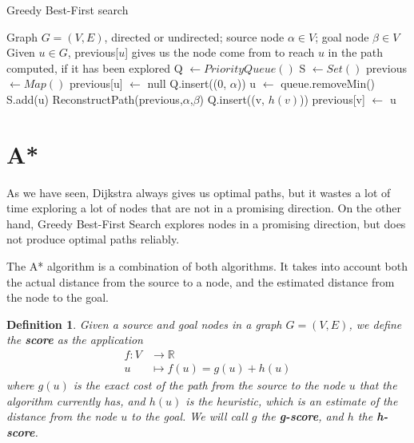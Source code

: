 \documentclass[12pt]{report}
\newtheorem{definition}[theorem]{Definition}
\begin{document}
\begin{algorithm}
\caption{Greedy Best-First search}
\label{alg:greedy}
\begin{algorithmic}[1]
\Require Graph $G = (V, E)$, directed or undirected; source node $\alpha \in V$; goal node $\beta \in V$
\Ensure Given $u \in G$, previous[$u$] gives us the node come from to reach $u$ in the path computed, if it has been explored
\State Q $\gets PriorityQueue()$
\State S $\gets Set()$
\State previous $\gets Map()$
	\State previous[u] $\gets$ null
\EndFor
\State Q.insert((0, $\alpha$))
	\State u $\gets$ queue.removeMin()
	\State S.add(u)
	 
		\State \Return ReconstructPath(previous,$\alpha$,$\beta$)
	\EndIf
			\Continue
		\EndIf
		\State Q.insert((v, $h(v)$))
		\State previous[v] $\gets$ u
	\EndFor
\EndWhile
\EndProcedure
\end{algorithmic}
\end{algorithm}



\section{A*}
As we have seen, Dijkstra always gives us optimal paths, but it wastes a lot of time exploring a lot of nodes that are not in a promising direction. On the other hand, Greedy Best-First Search explores nodes in a promising direction, but does not produce optimal paths reliably.

The A* algorithm is a combination of both algorithms. It takes into account both the actual distance from the source to a node, and the estimated distance from the node to the goal.

\begin{definition}
Given a source and goal nodes in a graph $G = (V, E)$, we define the \textbf{score} as the application
\begin{align*}
	f \colon V &\to \mathbb{R}\\
	u &\mapsto f(u) = g(u) + h(u)
\end{align*}
where $g(u)$ is the exact cost of the path from the source to the node $u$ that the algorithm currently has, and $h(u)$ is the heuristic, which is an estimate of the distance from the node $u$ to the goal.
We will call $g$ the \textbf{g-score}, and $h$ the \textbf{h-score}.
\end{definition}
\end{document}
